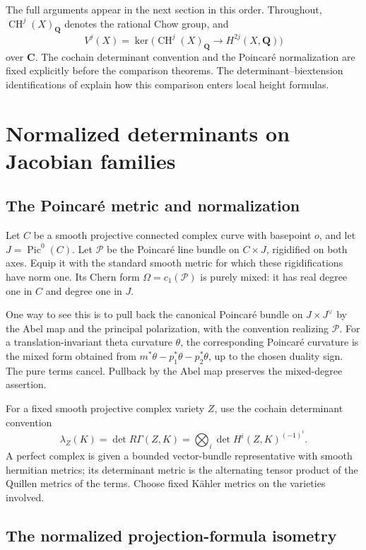 \documentclass[11pt,a4paper]{article}
\theoremstyle{definition}
\theoremstyle{remark}
\newcommand{\Q}{\mathbf Q}
\newcommand{\CH}{\operatorname{CH}}
\newcommand{\Pic}{\operatorname{Pic}}
\newcommand{\cP}{\mathcal P}
\begin{document}
The full arguments appear in the next section in this order. Throughout,
\(\CH^j(X)_{\Q}\) denotes the rational Chow group, and
\[
 V^j(X)=\ker\bigl(\CH^j(X)_{\Q}\longrightarrow
                    H^{2j}(X,\Q)\bigr)
\]
over \(\mathbf C\). The cochain determinant convention and the
Poincar\'e normalization are fixed explicitly before the comparison
theorems. The determinant--biextension identifications of
\cite{Gorchinskiy,Nakayama} explain how this comparison enters local
height formulas.


\section{Normalized determinants on Jacobian families}\label{sec:metrics}

\subsection{The Poincaré metric and normalization}\label{sec:poincare-metric}

Let \(C\) be a smooth projective connected complex curve with
basepoint \(o\), and let \(J=\Pic^0(C)\). Let \(\cP\) be the
Poincaré line bundle on \(C\times J\), rigidified on both axes.
Equip it with the standard smooth metric for which these
rigidifications have norm one. Its Chern form
\(\Omega=c_1(\cP)\) is purely mixed: it has real degree one in
\(C\) and degree one in \(J\).

One way to see this is to pull back the canonical Poincaré bundle
on \(J\times J^\vee\) by the Abel map and the principal
polarization, with the convention realizing \(\cP\). For a
translation-invariant theta curvature \(\theta\), the corresponding
Poincaré curvature is the mixed form obtained from
\(m^*\theta-p_1^*\theta-p_2^*\theta\), up to the chosen duality
sign. The pure terms cancel. Pullback by the Abel map preserves
the mixed-degree assertion.

For a fixed smooth projective complex variety \(Z\), use the
cochain determinant convention
\[
 \lambda_Z(K)=\det R\Gamma(Z,K)
       =\bigotimes_i\det H^i(Z,K)^{(-1)^i}.
\]
A perfect complex is given a bounded vector-bundle representative
with smooth hermitian metrics; its determinant metric is the
alternating tensor product of the Quillen metrics of the terms.
Choose fixed Kähler metrics on the varieties involved.

\subsection{The normalized projection-formula isometry}
\label{sec:quillen-proof}
\end{document}
